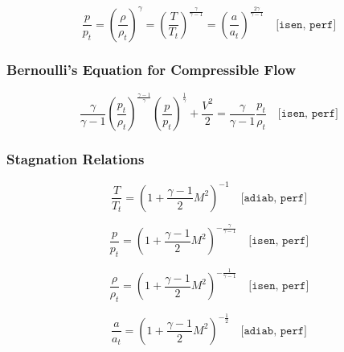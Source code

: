 \begin{equation}
	\frac{p}{p_t} = \left( \frac{\rho}{\rho_t} \right)^\gamma = \left( \frac{T}{T_t} \right)^{\frac{\gamma}{\gamma - 1}} = \left( \frac{a}{a_t} \right)^{\frac{2\gamma}{\gamma - 1}}
	\quad \texttt{[isen, perf]}
\end{equation}

\subsubsection*{Bernoulli's Equation for Compressible Flow}

\begin{equation}
	\frac{\gamma}{\gamma - 1} \left( \frac{p_t}{\rho_t} \right)^{\frac{\gamma - 1}{\gamma}} \left( \frac{p}{p_t} \right)^{\frac{1}{\gamma}} + \frac{V^2}{2} = \frac{\gamma}{\gamma - 1} \frac{p_t}{\rho_t} 
	\quad \texttt{[isen, perf]}
\end{equation}

\subsubsection*{Stagnation Relations}

\begin{equation}
	\frac{T}{T_t} = \left( 1 + \frac{\gamma - 1}{2} M^2 \right)^{-1}
	\quad \texttt{[adiab, perf]}
	\label{eq:total_relation_T}
\end{equation}

\begin{equation}
	\frac{p}{p_t} = \left( 1 + \frac{\gamma - 1}{2} M^2 \right)^{-\frac{\gamma}{\gamma - 1}}
	\quad \texttt{[isen, perf]}
	\label{eq:total_relation_p}
\end{equation}

\begin{equation}
	\frac{\rho}{\rho_t} = \left( 1 + \frac{\gamma - 1}{2} M^2 \right)^{-\frac{1}{\gamma - 1}}
	\quad \texttt{[isen, perf]}
	\label{eq:total_relation_rho}
\end{equation}

\begin{equation}
	\frac{a}{a_t} = \left( 1 + \frac{\gamma - 1}{2} M^2 \right)^{-\frac{1}{2}}
	\quad \texttt{[adiab, perf]}
\end{equation}

\blankpage
